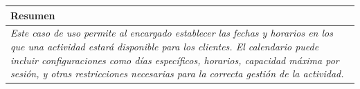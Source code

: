     \begin{table}[H]
        \begin{tabular}{llllllll}
    \hline
    \multicolumn{8}{|l|}{\cellcolor[HTML]{F2F2F2}Resumen}                                                                                                                                                                                                                                                                                                                                                                                             \\ \hline
    \multicolumn{8}{|p{15cm}|}{{\color[HTML]{808080} \textit{Este caso de uso permite al encargado establecer las fechas y horarios en los que una actividad estará disponible para los clientes. El calendario puede incluir configuraciones como días específicos, horarios, capacidad máxima por sesión, y otras restricciones necesarias para la correcta gestión de la actividad.}}} \\ \hline
    \end{tabular}
    \end{table}

